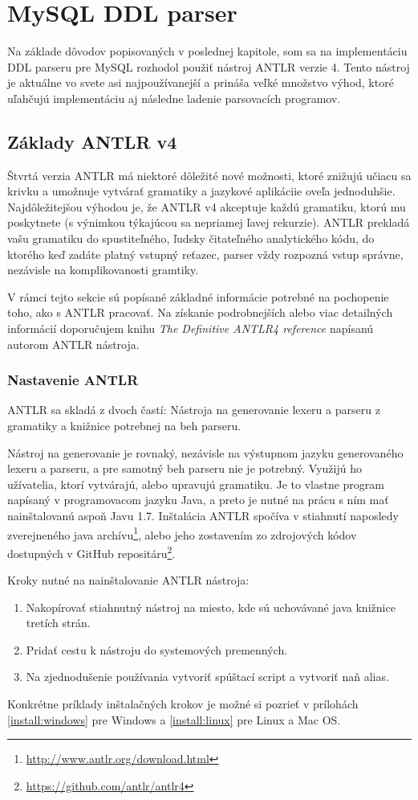 \chapter{MySQL DDL parser}
Na základe dôvodov popisovaných v poslednej kapitole, som sa na implementáciu DDL parseru pre MySQL rozhodol použiť nástroj ANTLR verzie 4. Tento nástroj je aktuálne vo svete asi najpoužívanejší a prináša veľké množstvo výhod, ktoré uľahčujú implementáciu aj následne ladenie parsovacích programov.

\section{Základy ANTLR v4}

Štvrtá verzia ANTLR má niektoré dôležité nové možnosti, ktoré znižujú učiacu sa krivku a umožnuje vytvárať gramatiky a jazykové aplikáciie oveľa jednoduhšie. Najdôležitejšou výhodou je, že ANTLR v4 akceptuje každú gramatiku, ktorú mu poskytnete (s výnimkou týkajúcou sa nepriamej ľavej rekurzie). ANTLR prekladá vašu gramatiku do spustiteľného, ľudsky čitateľného analytického kódu, do ktorého keď zadáte platný vstupný reťazec, parser vždy rozpozná vstup správne, nezávisle na komplikovanosti gramtiky.

V rámci tejto sekcie sú popísané základné informácie potrebné na pochopenie toho, ako s ANTLR pracovať. Na získanie podrobnejších alebo viac detailných informácií doporučujem knihu \textit{The Definitive ANTLR4 reference}\cite{definitiveANTLR} napísanú autorom ANTLR nástroja.

\subsection{Nastavenie ANTLR}
ANTLR sa skladá z dvoch častí: Nástroja na generovanie lexeru a parseru z gramatiky a knižnice potrebnej na beh parseru.

Nástroj na generovanie je rovnaký, nezávisle na výstupnom jazyku generovaného lexeru a parseru, a pre samotný beh parseru nie je potrebný. Využijú ho užívatelia, ktorí vytvárajú, alebo upravujú gramatiku. Je to vlastne program napísaný v programovacom jazyku Java, a preto je nutné na prácu s ním mať nainštalovanú aspoň Javu 1.7. Inštalácia ANTLR spočíva v stiahnutí naposledy zverejneného java archívu\footnote{\url{http://www.antlr.org/download.html}}, alebo jeho zostavením zo zdrojových kódov dostupných v GitHub repositáru\footnote{\url{https://github.com/antlr/antlr4}}. 

Kroky nutné na nainštalovanie ANTLR nástroja:
\begin{enumerate}
\item Nakopírovať stiahnutný nástroj na miesto, kde sú uchovávané java knižnice tretích strán.
\item Pridať cestu k nástroju do systemových premenných.
\item Na zjednodušenie používania vytvoriť spúštací script a vytvoriť naň alias.
\end{enumerate}
Konkrétne príklady inštalačných krokov je možné si pozrieť v prílohách \ref{install:windows} pre Windows a \ref{install:linux} pre Linux a Mac OS.

